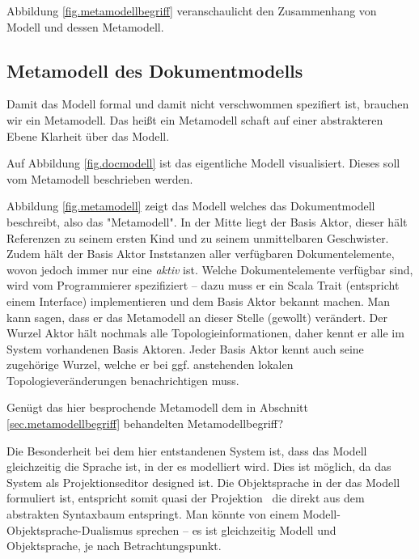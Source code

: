Abbildung \ref{fig.metamodellbegriff} veranschaulicht den Zusammenhang von
Modell und dessen Metamodell.



\subsection{Metamodell des Dokumentmodells}\label{sec.meta}

Damit das Modell formal und damit nicht verschwommen spezifiert ist,
brauchen wir ein Metamodell. Das heißt ein Metamodell schaft auf einer
abstrakteren Ebene Klarheit über das Modell.

Auf Abbildung \ref{fig.docmodell} ist das eigentliche Modell visualisiert.
Dieses soll vom Metamodell beschrieben werden.


Abbildung \ref{fig.metamodell} zeigt das Modell welches das Dokumentmodell beschreibt,
also das "Metamodell".
In der Mitte liegt der Basis Aktor, dieser hält Referenzen zu seinem ersten Kind
und zu seinem unmittelbaren Geschwister.
Zudem hält der Basis Aktor Inststanzen aller verfügbaren Dokumentelemente,
wovon jedoch immer nur eine \emph{aktiv} ist.
Welche Dokumentelemente verfügbar sind, wird vom Programmierer spezifiziert -- dazu
muss er ein Scala Trait (entspricht einem Interface) implementieren und dem
Basis Aktor bekannt machen.
Man kann sagen, dass er das Metamodell an dieser Stelle (gewollt) verändert.
Der Wurzel Aktor hält nochmals alle Topologieinformationen, daher kennt er
alle im System vorhandenen Basis Aktoren.
Jeder Basis Aktor kennt auch seine zugehörige Wurzel, welche er bei ggf. anstehenden
lokalen Topologieveränderungen benachrichtigen muss.


Genügt das hier besprochende Metamodell dem in Abschnitt
\ref{sec.metamodellbegriff} behandelten Metamodellbegriff?

Die Besonderheit bei dem hier entstandenen System ist, dass das
Modell gleichzeitig die Sprache ist, in der es modelliert wird.
Dies ist möglich, da das System als Projektionseditor designed ist.
Die Objektsprache in der das Modell formuliert ist,
entspricht somit quasi der Projektion
~die direkt aus dem abstrakten Syntaxbaum entspringt.
Man könnte von einem Modell-Objektsprache-Dualismus sprechen --
es ist gleichzeitig Modell und Objektsprache, je nach Betrachtungspunkt.

